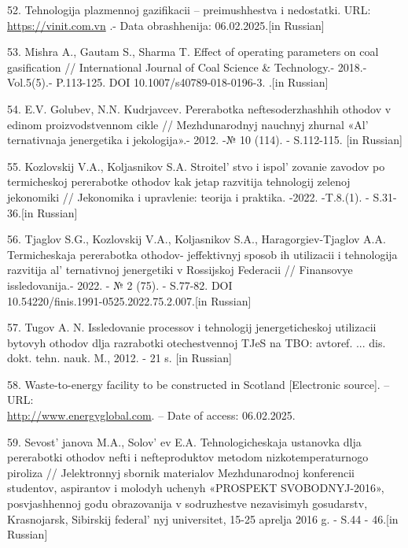 \begin{references}
52. Tehnologija plazmennoj gazifikacii -- preimushhestva i nedostatki.
URL: \href{https://vinit.com.vn/ru/tehnologija-plazmennoj-gazifikacii-p/}{https://vinit.com.vn} .-
Data obrashhenija: 06.02.2025.{[}in Russian{]}

53. Mishra A., Gautam S., Sharma T. Effect of operating parameters on
coal gasification // International Journal of Coal Science \&
Technology.- 2018.- Vol.5(5).- P.113-125.
DOI 10.1007/s40789-018-0196-3. .{[}in Russian{]}

54. E.V. Golubev, N.N. Kudrjavcev. Pererabotka neftesoderzhashhih
othodov v edinom proizvodstvennom cikle // Mezhdunarodnyj nauchnyj
zhurnal «Al' ternativnaja jenergetika i jekologija».-
2012. -№ 10 (114). - S.112-115. {[}in Russian{]}

55. Kozlovskij V.A., Koljasnikov S.A. Stroitel' stvo i
ispol' zovanie zavodov po termicheskoj pererabotke
othodov kak jetap razvitija tehnologij zelenoj jekonomiki // Jekonomika
i upravlenie: teorija i praktika. -2022. -T.8.(1). - S.31-36.{[}in
Russian{]}

56. Tjaglov S.G., Kozlovskij V.A., Koljasnikov S.A., Haragorgiev-Tjaglov
A.A. Termicheskaja pererabo\-tka othodov- jeffektivnyj sposob ih
utilizacii i tehnologija razvitija al' ternativnoj
jenergetiki v Rossijskoj Federacii // Finansovye issledovanija.- 2022. -
№ 2 (75). - S.77-82. DOI \\10.54220/finis.1991-0525.2022.75.2.007.{[}in
Russian{]}

57. Tugov A. N. Issledovanie processov i tehnologij jenergeticheskoj
utilizacii bytovyh othodov dlja razrabotki otechestvennoj TJeS na TBO:
avtoref. ... dis. dokt. tehn. nauk. M., 2012. - 21 s. {[}in Russian{]}

58. Waste-to-energy facility to be constructed in Scotland {[}Electronic
source{]}. -- URL:\\
\href{http://www.energyglobal.com/other-renewables/27102021/waste-to-energy-facility-to-be-constructed-in-scotland}{http://www.energyglobal.com}.
-- Date of access: 06.02.2025.

59. Sevost' janova M.A., Solov' ev E.A.
Tehnologicheskaja ustanovka dlja pererabotki othodov nefti i
nefteproduktov metodom nizkotemperaturnogo piroliza // Jelektronnyj
sbornik materialov Mezhdunarod\-noj konferencii studentov, aspirantov i
molodyh uchenyh «PROSPEKT SVOBODNYJ-2016», posvjash\-hennoj godu
obrazovanija v sodruzhestve nezavisimyh gosudarstv, Krasnojarsk,
Sibirskij federal' nyj universitet, 15-25 aprelja 2016 g.
- S.44 - 46.{[}in Russian{]}


\end{references}
